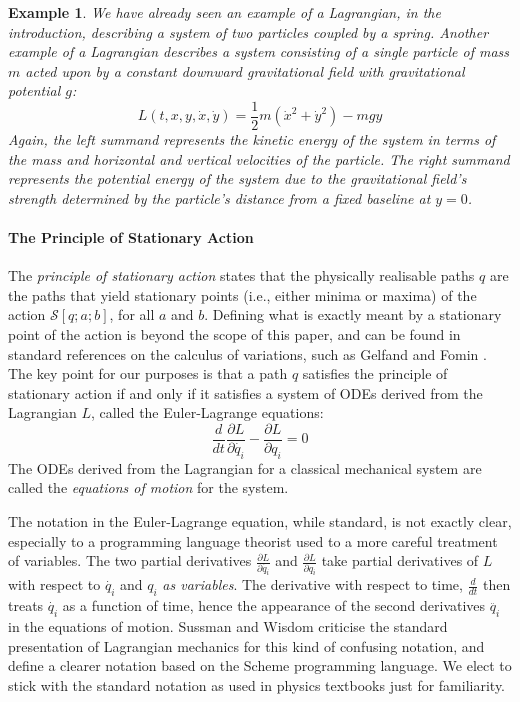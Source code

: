 \documentclass[preprint]{sigplanconf}
\theoremstyle{examplestyle}
\newtheorem{example}{Example}
\begin{document}
\begin{example}
  We have already seen an example of a Lagrangian, in the
  introduction, describing a system of two particles coupled by a
  spring. Another example of a Lagrangian describes a system
  consisting of a single particle of mass $m$ acted upon by a constant
  downward gravitational field with gravitational potential $g$:
  \begin{equation}\label{eq:simple-g-lagrangian}
    L(t,x,y,\dot{x},\dot{y}) = \frac{1}{2}m(\dot{x}^2 + \dot{y}^2) - mgy
  \end{equation}
  Again, the left summand represents the kinetic energy of the system
  in terms of the mass and horizontal and vertical velocities of the
  particle. The right summand represents the potential energy of the
  system due to the gravitational field's strength determined by the
  particle's distance from a fixed baseline at $y = 0$.
\end{example}

\paragraph{The Principle of Stationary Action}

The \emph{principle of stationary action} states that the physically
realisable paths $q$ are the paths that yield stationary points (i.e.,
either minima or maxima) of the action $\mathcal{S}[q;a;b]$, for all
$a$ and $b$. Defining what is exactly meant by a stationary point of
the action is beyond the scope of this paper, and can be found in
standard references on the calculus of variations, such as Gelfand and
Fomin \cite{gelfandXXcalculus}. The key point for our purposes is that
a path $q$ satisfies the principle of stationary action if and only if
it satisfies a system of ODEs derived from the Lagrangian $L$, called
the Euler-Lagrange equations:
\begin{equation}\label{eq:euler-lagrange}
  \frac{d}{dt}\frac{\partial L}{\partial \dot{q_i}} - \frac{\partial L}{\partial q_i} = 0
\end{equation}
The ODEs derived from the Lagrangian for a classical mechanical system
are called the \emph{equations of motion} for the system.

The notation in the Euler-Lagrange equation, while standard, is not
exactly clear, especially to a programming language theorist used to a
more careful treatment of variables. The two partial derivatives
$\frac{\partial L}{\partial \dot{q_i}}$ and $\frac{\partial
  L}{\partial q_i}$ take partial derivatives of $L$ with respect to
$\dot{q_i}$ and $q_i$ \emph{as variables}. The derivative with respect
to time, $\frac{d}{dt}$ then treats $\dot{q_i}$ as a function of time,
hence the appearance of the second derivatives $\ddot{q_i}$ in the
equations of motion. Sussman and Wisdom \cite{sussman} criticise the
standard presentation of Lagrangian mechanics for this kind of
confusing notation, and define a clearer notation based on the Scheme
programming language. We elect to stick with the standard notation as
used in physics textbooks just for familiarity.
\end{document}
